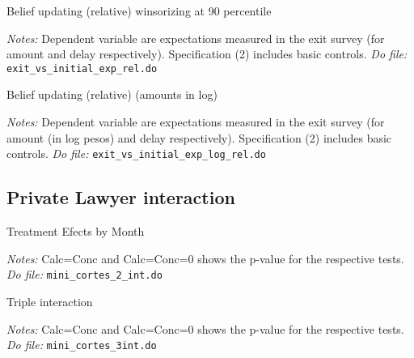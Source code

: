 \documentclass[11pt]{article}
\begin{document}
\begin{landscape}
 \begin{table}[H]
 \caption{Belief updating (relative) winsorizing at 90 percentile}
 \label{Belief_updating}
 \begin{center}
 \scriptsize{}
 \end{center}
  \footnotesize
 \textit{Notes:} 
 Dependent variable are expectations measured in the exit survey (for amount and delay respectively). Specification (2) includes basic controls.
 \textit{Do file: } \texttt{exit\_vs\_initial\_exp\_rel.do}
 \end{table}


 \begin{table}[H]
 \caption{Belief updating (relative) (amounts in log)}
 \label{Belief_updating_log}
 \begin{center}
 \scriptsize{}
 \end{center}
  \footnotesize
 \textit{Notes:} 
 Dependent variable are expectations measured in the exit survey (for amount (in log pesos) and delay respectively). Specification (2) includes basic controls.
 \textit{Do file: } \texttt{exit\_vs\_initial\_exp\_log\_rel.do}
 \end{table}


\end{landscape}


\subsection{Private Lawyer interaction}
\begin{table}[H]
    \caption{Treatment Efects by Month}
    \label{Table_effects}
    \begin{center}
    \scriptsize{}
    \end{center}
    \footnotesize
    \textit{Notes:} 
    Calc=Conc and Calc=Conc=0 shows the p-value for the respective tests.
    \textit{Do file: } \texttt{mini\_cortes\_2\_int.do}
\end{table}


\begin{table}[H]
    \caption{Triple interaction}
    \label{Table_effects}
    \begin{center}
    \scriptsize{}
    \end{center}
    \footnotesize
    \textit{Notes:} 
    Calc=Conc and Calc=Conc=0 shows the p-value for the respective tests.
    \textit{Do file: } \texttt{mini\_cortes\_3int.do}
\end{table}
\end{document}
